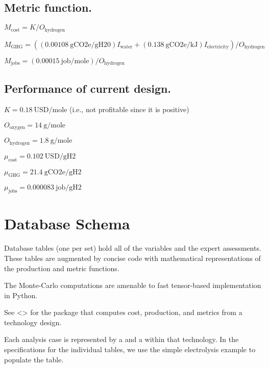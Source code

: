 \documentclass[letterpaper,10pt,english]{sphinxmanual}
\begin{document}
\section{Metric function.}
\label{\detokenize{example-electrolysis:metric-function}}
\(M_\mathrm{cost} = K / O_\mathrm{hydrogen}\)

\(M_\mathrm{GHG} = \left( \left( 0.00108~\mathrm{gCO2e/gH20} \right) I_\mathrm{water} + \left( 0.138~\mathrm{gCO2e/kJ} \right) I_\mathrm{electricity} \right) / O_\mathrm{hydrogen}\)

\(M_\mathrm{jobs} = \left( 0.00015~\mathrm{job/mole} \right) / O_\mathrm{hydrogen}\)


\section{Performance of current design.}
\label{\detokenize{example-electrolysis:performance-of-current-design}}
\(K = 0.18~\mathrm{USD/mole}\) (i.e., not profitable since it is
positive)

\(O_\mathrm{oxygen} = 14~\mathrm{g/mole}\)

\(O_\mathrm{hydrogen} = 1.8~\mathrm{g/mole}\)

\(\mu_\mathrm{cost} = 0.102~\mathrm{USD/gH2}\)

\(\mu_\mathrm{GHG} = 21.4~\mathrm{gCO2e/gH2}\)

\(\mu_\mathrm{jobs} = 0.000083~\mathrm{job/gH2}\)


\chapter{Database Schema}
\label{\detokenize{database:database-schema}}\label{\detokenize{database::doc}}
Database tables (one per set) hold all of the variables and the expert
assessments. These tables are augmented by concise code with
mathematical representations of the production and metric functions.

The Monte-Carlo computations are amenable to fast tensor-based
implementation in Python.

See
\textless{}\textgreater{}
for the  package that computes cost, production, and metrics
from a technology design.

Each analysis case is represented by a  and a 
within that technology. In the specifications for the individual tables,
we use the simple electrolysis example to populate the table.
\end{document}
